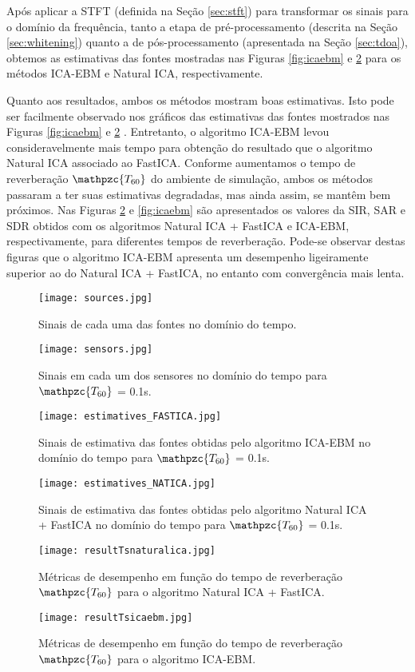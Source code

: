     Após aplicar a STFT (definida na Seção \ref{sec:stft}) para transformar os sinais para o domínio da frequência, tanto a etapa de pré-processamento (descrita na Seção \ref{sec:whitening}) quanto a de pós-processamento (apresentada na Seção \ref{sec:tdoa}), obtemos as estimativas das fontes mostradas nas Figuras \ref{fig:icaebm} e \ref{fig:natica} para os métodos ICA-EBM e Natural ICA, respectivamente.
    
    Quanto aos resultados, ambos os métodos mostram boas estimativas. Isto pode ser facilmente observado nos gráficos das estimativas das fontes mostrados nas Figuras \ref{fig:icaebm} e \ref{fig:natica} . Entretanto, o algoritmo ICA-EBM levou consideravelmente mais tempo para obtenção do resultado que o algoritmo Natural ICA associado ao FastICA. Conforme aumentamos o tempo de reverberação $\mathpzc{T_{60}}$ do ambiente de simulação, ambos os métodos passaram a ter suas estimativas degradadas, mas ainda assim, se mantêm bem próximos. Nas Figuras \ref{fig:natica} e \ref{fig:icaebm} são apresentados os valores da SIR, SAR e SDR obtidos com os algoritmos Natural ICA + FastICA e ICA-EBM, respectivamente, para diferentes tempos de reverberação. Pode-se observar destas figuras que o algoritmo ICA-EBM apresenta um desempenho ligeiramente superior ao do Natural ICA + FastICA, no entanto com convergência mais lenta.
    
    \begin{figure}
        \centering
        \texttt{[image: sources.jpg]}
            \caption{Sinais de cada uma das fontes no domínio do tempo.}
        \label{fig:sources}
        \texttt{[image: sensors.jpg]}
            \caption{Sinais em cada um dos sensores no domínio do tempo para $\mathpzc{T_{60}}$ = 0.1s.}
        \label{fig:sensors}
    \end{figure}
    
    \begin{figure}
        \centering
        \texttt{[image: estimatives\_FASTICA.jpg]}
        \caption{Sinais de estimativa das fontes obtidas pelo algoritmo ICA-EBM no domínio do tempo para $\mathpzc{T_{60}}$ = 0.1s.}
        \label{fig:icaebm}
        \texttt{[image: estimatives\_NATICA.jpg]}
        \caption{Sinais de estimativa das fontes obtidas pelo algoritmo Natural ICA + FastICA  no domínio do tempo para $\mathpzc{T_{60}}$ = 0.1s.}
        \label{fig:natica}
    \end{figure}
    
    
    \begin{figure}
        \centering
        \texttt{[image: resultTsnaturalica.jpg]}
        \caption{Métricas de desempenho em função do tempo de reverberação $\mathpzc{T_{60}}$ para o algoritmo Natural ICA + FastICA.}
        \label{fig:T60natica}
         \texttt{[image: resultTsicaebm.jpg]}
        \caption{Métricas de desempenho em função do tempo de reverberação $\mathpzc{T_{60}}$ para o algoritmo ICA-EBM.}
        \label{fig:T60icaebm}
    \end{figure}
    